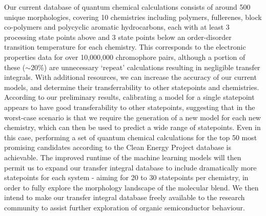 \documentclass[12pt]{article}
\begin{document}


Our current database of quantum chemical calculations consists of around 500 unique morphologies, covering 10 chemistries including polymers, fullerenes, block co-polymers and polycyclic aromatic hydrocarbons, each with at least 3 processing state points above and 3 state points below an order-disorder transition temperature for each chemistry.
This corresponds to the electronic properties data for over 10,000,000 chromophore pairs, although a portion of these ($\sim$20\%) are unnecessary `repeat' calculations resulting in negligible transfer integrals.
With additional resources, we can increase the accuracy of our current models, and determine their transferrability to other statepoints and chemistries.
According to our preliminary results, calibrating a model for a single statepoint appears to have good transferability to other statepoints, suggesting that in the worst-case scenario is that we require the generation of a new model for each new chemistry, which can then be used to predict a wide range of statepoints.
Even in this case, performing a set of quantum chemical calculations for the top 50 most promising candidates according to the Clean Energy Project database is achievable.
The improved runtime of the machine learning models will then permit us to expand our transfer integral database to include dramatically more statepoints for each system - aiming for 20 to 30 statepoints per chemistry, in order to fully explore the morphology landscape of the molecular blend.
We then intend to make our transfer integral database freely available to the research community to assist further exploration of organic semiconductor behaviour.


\end{document}
